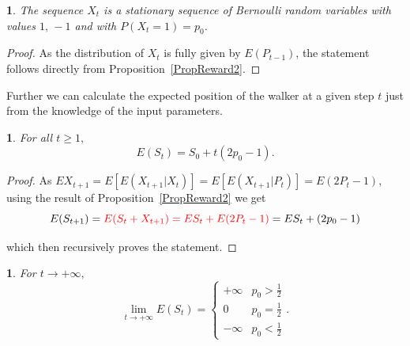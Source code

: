 \documentclass{amsart}
\theoremstyle{definition}
\theoremstyle{plain}
\newtheorem{prop}[thm]{\protect\propositionname}
\theoremstyle{plain}
\newtheorem{cor}[thm]{\protect\corollaryname}
\theoremstyle{plain}
\numberwithin{equation}{section}
\providecommand{\corollaryname}{Corollary}
\providecommand{\propositionname}{Proposition}
\begin{document}
    \begin{prop}
        The sequence $X_t$ is a stationary sequence of Bernoulli random
        variables with values $1,\,-1$ and with $P(X_t=1)=p_0$.
    \end{prop}
    \begin{proof}
        As the distribution of $X_t$ is fully given by $E(P_{t-1})$, the
        statement follows directly from Proposition~\ref{PropReward2}.
    \end{proof}

    {\color{red}Further we can} calculate the expected position of the walker at a given step $t$ just from the knowledge of the input parameters.

    \begin{prop}
        For all $t\geq1,$
        \[
            E(S_{t})=S_{0}+t(2p_{0}-1).
        \]
    \end{prop}
    \begin{proof}
    {\color{red}As $EX_{t+1}=E[E(X_{t+1}|X_t)]=E[E(X_{t+1}|P_t)]=E(2P_t -1)$, u}sing the result of Proposition~\ref{PropReward2} we get
        \[
            E(S_{t+1})= {\color{red}E(S_{t}+X_{t+1}) = ES_{t}+E(2P_{ \color{red}t}-1)}=
            ES_{t}+(2p_{0}-1)
        \]

        which then recursively proves the statement.
    \end{proof}

    \begin{cor}
        For $t\rightarrow+\infty,$ \textup{
            \[
                \lim_{t\to+\infty}E(S_{t})=\begin{cases}
                                               +\infty & p_{0}>\frac{1}{2}\\
                                               0 & p_{0}=\frac{1}{2}\\
                                               -\infty & p_{0}<\frac{1}{2}
                \end{cases}.
            \]
        }
    \end{cor}
\end{document}
